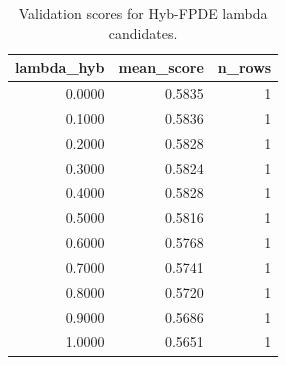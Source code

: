 \begin{table}[t]
\caption{Validation scores for Hyb-FPDE lambda candidates.}
\label{tab:lambda_distribution_computed}
\centering
\begin{tabular}{rrr}
\toprule
lambda\_hyb & mean\_score & n\_rows \\
\midrule
0.0000 & 0.5835 & 1 \\
0.1000 & 0.5836 & 1 \\
0.2000 & 0.5828 & 1 \\
0.3000 & 0.5824 & 1 \\
0.4000 & 0.5828 & 1 \\
0.5000 & 0.5816 & 1 \\
0.6000 & 0.5768 & 1 \\
0.7000 & 0.5741 & 1 \\
0.8000 & 0.5720 & 1 \\
0.9000 & 0.5686 & 1 \\
1.0000 & 0.5651 & 1 \\
\bottomrule
\end{tabular}

\end{table}
